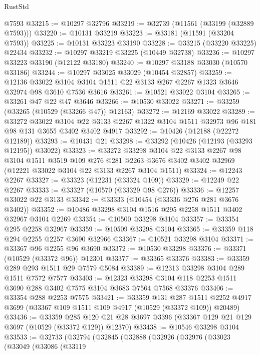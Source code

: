 \begin{lexlean}{RustStd}
\begin{coremodule}
    @7593
@33215 := @10297 @32796
@33219 := @32739 (@11561 (@33199 (@32889 @7593)))
@33220 := @10131 @33219
@33223 := @33181 (@11591 (@33204 @7593))
@33225 := @10131 @33223 @33190
@33228 := @33215 (@33220 @33225) @22434
@33232 := @10297 @33219 @33225 (@10449 @32738)
@33236 := @10297 @33223 @33190 (@12122 @33180)
@33240 := @10297 @33188 @33030 (@10570 @33186)
@33244 := @10297 @33025 @33029 (@10454 @32857)
@33259 := @12136
    @33022
    @3104
    @3104
    @1511
    @22
    @3133
    @267
    @2267
    @1323
    @3646
    @32974
    @98
    @3610
    @7536
    @3616
@33261 := @10521 @33022 @3104
@33265 := @33261 @47 @22 @47 @3646
@33266 := @10530 @33022
@33271 := @33259 (@33265 (@10529 (@33266 @47)) @12163)
@33272 := @12169 @33022
@33289 := @33272
    @33022
    @3104
    @22
    @3133
    @2267
    @1322
    @3104
    @1511
    @32973
    @96
    @181
    @98
    @131
    @3655
    @3402
    @3402
    @4917
@33292 := @10426 (@12188 (@22272 @12189))
@33293 := @10431 @21
@33298 := @33292 (@10426 (@12193 (@33293 @12195)) @33022)
@33323 := @33272
    @33298
    @3104
    @22
    @3133
    @2267
    @98
    @3104
    @1511
    @3519
    @109
    @276
    @281
    @2263
    @3676
    @3402
    @3402
    @32969
    (@12221 @33022 @3104 @22 @3133 @2267 @3104 @1511)
@33324 := @12243 @2267
@33327 := @33323 (@12231 (@33324 @109))
@33329 := @12249 @22 @2267
@33333 := @33327 (@10570 (@33329 @98 @276))
@33336 := @12257 @33022 @22 @3133
@33342 := @33333 (@10454 (@33336 @276 @281 @3676 @3402))
@33352 := @10486 @33298 @3104 @1516 @295 @2258 @1511 @3402 @32967 @3104 @2269
@33354 := @10500 @33298 @3104
@33357 := @33354 @295 @2258 @32967
@33359 := @10509 @33298 @3104
@33365 := @33359 @118 @294 @2255 @2257 @3690 @32966
@33367 := @10521 @33298 @3104
@33371 := @33367 @96 @2255 @96 @3690
@33372 := @10530 @33298
@33376 := @33371 (@10529 (@33372 @96)) @12301
@33377 := @33365 @33376
@33383 := @33359 @289 @293 @1511 @29 @7579 @5084
@33389 := @12313 @33298 @3104 @289 @1511 @7572 @7577
@33403 := @12323 @33298 @3104 @118 @2253 @1511 @3690 @288 @3402 @7575 @3104 @3683 @7564 @7568 @33376
@33406 := @33354 @288 @2253 @7575
@33421 := @33359
    @131
    @287
    @1511
    @2252
    @4917
    @3699
    (@33367 @109 @1511 @109 @4917 (@10529 (@33372 @109)) @20489)
@33436 := @33359
    @285
    @120
    @21
    @28
    @3697
    @3396
    (@33367 @129 @21 @129 @3697 (@10529 (@33372 @129)) @12370)
@33438 := @10546 @33298 @3104
@33533 := @32733
    (@32794
      (@32845
        (@32888
          (@32926
            (@32976
              (@33023
                (@33049
                  (@33086
                    (@33119

\end{coremodule}
\end{lexlean}

